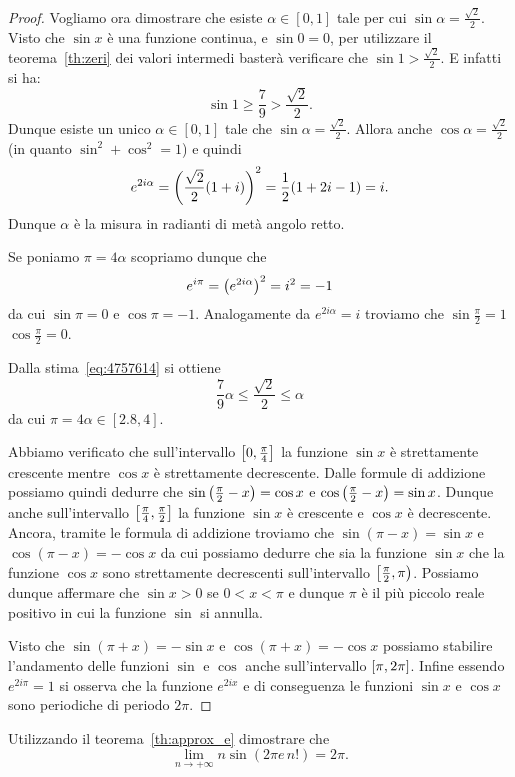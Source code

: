\begin{proof}
Vogliamo ora dimostrare che esiste 
$\alpha \in [0,1]$ tale per cui 
$\sin \alpha = \frac{\sqrt 2}{2}$.
Visto che $\sin x$ è una funzione continua, 
e $\sin 0 = 0$, per utilizzare 
il teorema~\ref{th:zeri} dei valori intermedi 
basterà verificare che $\sin 1 > \frac{\sqrt 2}{2}$.
E infatti si ha:
\[
\sin 1 \ge \frac 7 9 > \frac{\sqrt 2}{2}.
\]
Dunque esiste un unico $\alpha\in [0,1]$ 
tale che $\sin \alpha = \frac{\sqrt 2}{2}$.
Allora anche $\cos \alpha = \frac{\sqrt 2}{2}$ 
(in quanto $\sin^2 + \cos^2 = 1$)
e quindi
\[
  e^{2i\alpha} 
  = {\left( \frac{\sqrt 2}{2} {\left( 1+i \right)} \right)}^2
  = \frac 1 2 {\left( 1+2i-1 \right)} = i.
\]
Dunque $\alpha$ è la misura in radianti di metà 
angolo retto.

Se poniamo $\pi = 4\alpha$ scopriamo dunque che 
\[
  e^{i\pi} 
  = {\left( e^{2i\alpha} \right)}^2
  = i^2 = -1
\]
da cui $\sin \pi = 0$ e $\cos \pi = -1$.
Analogamente da $e^{2i\alpha}=i$ 
troviamo che $\sin \frac \pi 2 = 1$
$\cos \frac \pi 2 = 0$.

Dalla stima~\eqref{eq:4757614} si ottiene 
\[
  \frac 7 9 \alpha 
  \le \frac{\sqrt 2}{2}
  \le \alpha
\]
da cui $\pi=4\alpha \in [2.8, 4]$.

Abbiamo verificato che sull'intervallo 
$\left[0,\frac \pi 4\right]$ la funzione $\sin x$ è strettamente 
crescente mentre $\cos x$ è strettamente decrescente.
Dalle formule di addizione possiamo quindi dedurre che 
$\sin{\left( \frac \pi 2 - x \right)} = \cos x$ 
e $\cos{\left( \frac \pi 2 -x \right)} = \sin x$.
Dunque anche sull'intervallo $\left[\frac \pi 4,\frac \pi 2\right]$ 
la funzione $\sin x$ è crescente e $\cos x$ è decrescente.
Ancora, tramite le formula di addizione troviamo che 
$\sin(\pi - x)=\sin x$ e $\cos(\pi - x) = -\cos x$ 
da cui possiamo dedurre che sia la funzione $\sin x$ 
che la funzione $\cos x$ sono strettamente decrescenti 
sull'intervallo $\left[\frac \pi 2,\pi\right)$.
Possiamo dunque affermare che $\sin x>0$ se $0<x<\pi$ 
e dunque $\pi$ è il più piccolo reale positivo in cui 
la funzione $\sin$ si annulla.

Visto che $\sin(\pi+x) = -\sin x$ e $\cos(\pi+x)=-\cos x$
possiamo stabilire l'andamento delle funzioni $\sin$ e $\cos$
anche sull'intervallo $\left[\pi,2\pi\right]$.
Infine essendo $e^{2i\pi} = 1$ si osserva che la funzione 
$e^{2ix}$ e di conseguenza le funzioni $\sin x$ e $\cos x$
sono periodiche di periodo $2\pi$.
\end{proof}

\begin{exercise}
  Utilizzando il teorema~\ref{th:approx_e} dimostrare che
  \[
  \lim_{n\to +\infty} n \sin(2\pi e\, n!) = 2\pi.
  \]
\end{exercise}

